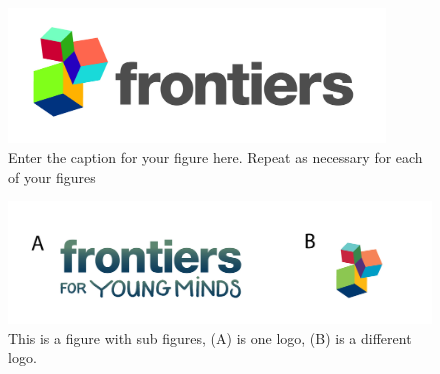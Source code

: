 \documentclass[utf8]{frontiersSCNS} %
\begin{document}
\begin{figure}[h!]
\begin{center}
\includegraphics[width=10cm]{logo1}%
\end{center}
\caption{ Enter the caption for your figure here.  Repeat as  necessary for each of your figures}\label{fig:1}
\end{figure}


\begin{figure}[h!]
\begin{center}
\includegraphics[width=15cm]{logos}
\end{center}
\caption{This is a figure with sub figures, (A) is one logo, (B) is a different logo.}\label{fig:2}
\end{figure}

\end{document}
